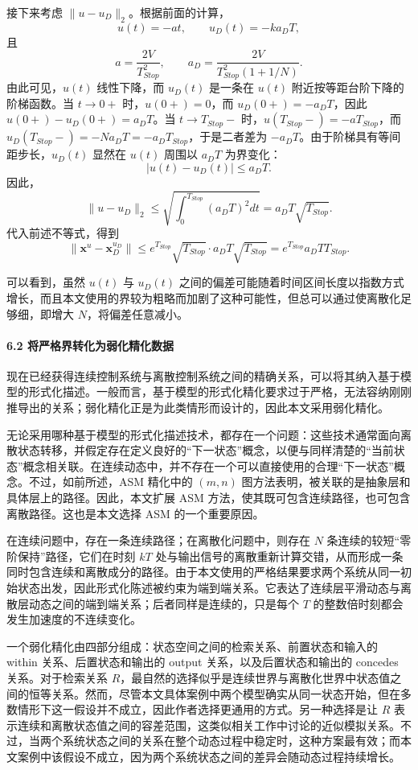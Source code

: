 {\indent 接下来考虑 $\|u-u_D\|_2$。根据前面的计算，
\[
u(t)=-at,\qquad u_D(t)=-ka_DT,
\]
且
\[
a=\frac{2V}{T_{Stop}^{2}},\qquad
a_D=\frac{2V}{T_{Stop}^{2}(1+1/N)} .
\]
由此可见，$u(t)$ 线性下降，而 $u_D(t)$ 是一条在 $u(t)$ 附近按等距台阶下降的阶梯函数。当 $t\to 0+$ 时，$u(0+)=0$，而 $u_D(0+)=-a_DT$，因此 $u(0+)-u_D(0+)=a_DT$。当 $t\to T_{Stop}-$ 时，$u(T_{Stop}-)=-aT_{Stop}$，而 $u_D(T_{Stop}-)=-Na_DT=-a_DT_{Stop}$，于是二者差为 $-a_DT$。由于阶梯具有等间距步长，$u_D(t)$ 显然在 $u(t)$ 周围以 $a_DT$ 为界变化：
\[
|u(t)-u_D(t)|\leq a_DT .
\]
因此，
\[
\|u-u_D\|_2
\leq
\sqrt{\int_{0}^{T_{Stop}}(a_DT)^2dt}
=a_DT\sqrt{T_{Stop}} .
\]
代入前述不等式，得到
\[
\|\mathbf{x}^{u}-\mathbf{x}_{D}^{u_D}\|
\leq
e^{T_{Stop}}\sqrt{T_{Stop}}\cdot a_DT\sqrt{T_{Stop}}
=e^{T_{Stop}}a_DTT_{Stop}.
\]

\indent 可以看到，虽然 $u(t)$ 与 $u_D(t)$ 之间的偏差可能随着时间区间长度以指数方式增长，而且本文使用的界较为粗略而加剧了这种可能性，但总可以通过使离散化足够细，即增大 $N$，将偏差任意减小。

\paragraph{6.2 将严格界转化为弱化精化数据}

\indent 现在已经获得连续控制系统与离散控制系统之间的精确关系，可以将其纳入基于模型的形式化描述。一般而言，基于模型的形式化精化要求过于严格，无法容纳刚刚推导出的关系；弱化精化正是为此类情形而设计的，因此本文采用弱化精化。

\indent 无论采用哪种基于模型的形式化描述技术，都存在一个问题：这些技术通常面向离散状态转移，并假定存在定义良好的“下一状态”概念，以便与同样清楚的“当前状态”概念相关联。在连续动态中，并不存在一个可以直接使用的合理“下一状态”概念。不过，如前所述，ASM 精化中的 $(m,n)$ 图方法表明，被关联的是抽象层和具体层上的路径。因此，本文扩展 ASM 方法，使其既可包含连续路径，也可包含离散路径。这也是本文选择 ASM 的一个重要原因。

\indent 在连续问题中，存在一条连续路径；在离散化问题中，则存在 $N$ 条连续的较短“零阶保持”路径，它们在时刻 $kT$ 处与输出信号的离散重新计算交错，从而形成一条同时包含连续和离散成分的路径。由于本文使用的严格结果要求两个系统从同一初始状态出发，因此形式化陈述被约束为端到端关系。它表达了连续层平滑动态与离散层动态之间的端到端关系；后者同样是连续的，只是每个 $T$ 的整数倍时刻都会发生加速度的不连续变化。

\indent 一个弱化精化由四部分组成：状态空间之间的检索关系、前置状态和输入的 within 关系、后置状态和输出的 output 关系，以及后置状态和输出的 concedes 关系。对于检索关系 $R$，最自然的选择似乎是连续世界与离散化世界中状态值之间的恒等关系。然而，尽管本文具体案例中两个模型确实从同一状态开始，但在多数情形下这一假设并不成立，因此作者选择更通用的方式。另一种选择是让 $R$ 表示连续和离散状态值之间的容差范围，这类似相关工作中讨论的近似模拟关系。不过，当两个系统状态之间的关系在整个动态过程中稳定时，这种方案最有效；而本文案例中该假设不成立，因为两个系统状态之间的差异会随动态过程持续增长。

}
